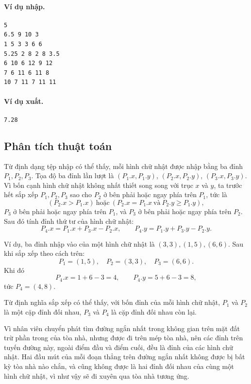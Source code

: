 \documentclass[11pt]{article}
\begin{document}
\paragraph{Ví dụ nhập.}
\begin{verbatim}
5
6.5 9 10 3
1 5 3 3 6 6
5.25 2 8 2 8 3.5
6 10 6 12 9 12
7 6 11 6 11 8
10 7 11 7 11 11
\end{verbatim}

\paragraph{Ví dụ xuất.}
\begin{verbatim}
7.28
\end{verbatim}

\subsection*{Phân tích thuật toán}

Từ định dạng tệp nhập có thể thấy, mỗi hình chữ nhật được nhập bằng ba đỉnh
\(P_1,P_2,P_3\). Tọa độ ba đỉnh lần lượt là \((P_1.x,P_1.y)\),
\((P_2.x,P_2.y)\), \((P_3.x,P_3.y)\). Vì bốn cạnh hình chữ nhật không nhất
thiết song song với trục \(x\) và \(y\), ta trước hết sắp xếp \(P_1,P_2,P_3\)
sao cho \(P_2\) ở bên phải hoặc ngay phía trên \(P_1\), tức là
\[
  (P_2.x>P_1.x)\ \text{hoặc}\ (P_2.x=P_1.x\ \text{và}\ P_2.y\ge P_1.y),
\]
\(P_3\) ở bên phải hoặc ngay phía trên \(P_1\), và \(P_3\) ở bên phải hoặc
ngay phía trên \(P_2\). Sau đó tính đỉnh thứ tư của hình chữ nhật:
\[
  P_4.x=P_1.x+P_3.x-P_2.x,\qquad
  P_4.y=P_1.y+P_3.y-P_2.y.
\]

Ví dụ, ba đỉnh nhập vào của một hình chữ nhật là \((3,3),(1,5),(6,6)\). Sau
khi sắp xếp theo cách trên:
\[
  P_1=(1,5),\quad P_2=(3,3),\quad P_3=(6,6).
\]
Khi đó
\[
  P_4.x=1+6-3=4,\qquad P_4.y=5+6-3=8,
\]
tức \(P_4=(4,8)\).

Từ định nghĩa sắp xếp có thể thấy, với bốn đỉnh của mỗi hình chữ nhật,
\(P_1\) và \(P_2\) là một cặp đỉnh đối nhau, \(P_3\) và \(P_4\) là cặp đỉnh
đối nhau còn lại.

Vì nhân viên chuyển phát tìm đường ngắn nhất trong không gian trên mặt đất
trừ phần trong của tòa nhà, nhưng được đi trên mép tòa nhà, nên các đỉnh trên
tuyến đường này, ngoài điểm đầu và điểm cuối, đều là đỉnh của các hình chữ
nhật. Hai đầu mút của mỗi đoạn thẳng trên đường ngắn nhất không được bị bất
kỳ tòa nhà nào chắn, và cũng không được là hai đỉnh đối nhau của cùng một
hình chữ nhật, vì như vậy sẽ đi xuyên qua tòa nhà tương ứng.
\end{document}
